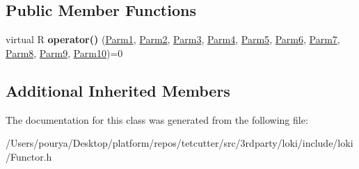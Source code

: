 \subsection*{Public Member Functions}
\begin{DoxyCompactItemize}
\item 
\hypertarget{classLoki_1_1FunctorImpl_3_01R_00_01Seq_3_01P1_00_01P2_00_01P3_00_01P4_00_01P5_00_01P6_00_01P7_0bc721448b5d6c373b3afd9cd894a0381_abf80b4a737922411a53b584d2720f34f}{}virtual R {\bfseries operator()} (\hyperlink{classLoki_1_1EmptyType}{Parm1}, \hyperlink{classLoki_1_1EmptyType}{Parm2}, \hyperlink{classLoki_1_1EmptyType}{Parm3}, \hyperlink{classLoki_1_1EmptyType}{Parm4}, \hyperlink{classLoki_1_1EmptyType}{Parm5}, \hyperlink{classLoki_1_1EmptyType}{Parm6}, \hyperlink{classLoki_1_1EmptyType}{Parm7}, \hyperlink{classLoki_1_1EmptyType}{Parm8}, \hyperlink{classLoki_1_1EmptyType}{Parm9}, \hyperlink{classLoki_1_1EmptyType}{Parm10})=0\label{classLoki_1_1FunctorImpl_3_01R_00_01Seq_3_01P1_00_01P2_00_01P3_00_01P4_00_01P5_00_01P6_00_01P7_0bc721448b5d6c373b3afd9cd894a0381_abf80b4a737922411a53b584d2720f34f}

\end{DoxyCompactItemize}
\subsection*{Additional Inherited Members}


The documentation for this class was generated from the following file\+:\begin{DoxyCompactItemize}
\item 
/\+Users/pourya/\+Desktop/platform/repos/tetcutter/src/3rdparty/loki/include/loki/Functor.\+h\end{DoxyCompactItemize}
